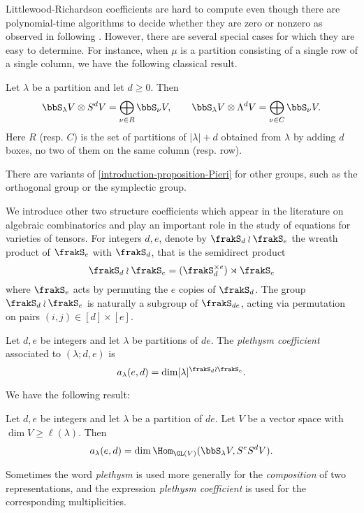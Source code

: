 Littlewood-Richardson coefficients are hard to compute \cite{Nar06} even though there are polynomial-time algorithms to decide whether they are zero or nonzero as observed in \cite{MNS12} following \cite{KT99}. However, there are several special cases for which they are easy to determine. For instance, when $\mu$ is a partition consisting of a single row of a single column, we have the following classical result.
\begin{proposition}
\label{introduction-proposition-Pieri}
 Let $\lambda$ be a partition and let $d \geq 0$. Then 
 \[
 \bbS_{\lambda} V \otimes S^d V = \bigoplus_{\nu \in R} \bbS_{\nu} V, \qquad  \bbS_{\lambda} V \otimes \Lambda^d V = \bigoplus_{\nu \in C} \bbS_{\nu} V.
 \]
Here $R$ (resp. $C$) is the set of partitions of $|\lambda|+d$ obtained from $\lambda$ by adding $d$ boxes, no two of them on the same column (resp. row).
\end{proposition}
There are variants of \ref{introduction-proposition-Pieri} for other groups, such as the orthogonal group or the symplectic group.

We introduce other two structure coefficients which appear in the literature on algebraic combinatorics and play an important role in the study of equations for varieties of tensors. For integers $d,e$, denote by $\frakS_d \wr \frakS_e$ the wreath product of $\frakS_e$ with $\frakS_d$, that is the semidirect product
\[
\frakS_d \wr \frakS_e = (\frakS_d ^{\times e}) \rtimes \frakS_e
\]
where $\frakS_e$ acts by permuting the $e$ copies of $\frakS_d$. The group $\frakS_d \wr \frakS_e $ is naturally a subgroup of $\frakS_{de}$, acting via permutation on pairs $(i,j) \in [d] \times [e]$.
\begin{definition}
 \label{introduction-definition-plethysm}
 Let $d,e$ be integers and let $\lambda$ be partitions of $de$. The {\it plethysm coefficient} associated to $(\lambda;d,e)$ is
 \[
a_\lambda(e,d) = \dim [\lambda]^{\frakS_d \wr \frakS_e}.
\]
\end{definition}
We have the following result:
\begin{lemma}
 \label{introduction-lemma-plethysmGL}
 Let $d,e$ be integers and let $\lambda$ be a partition of $de$. Let $V$ be a vector space with $\dim V \geq \ell(\lambda)$. Then
 \[
 a_\lambda(e,d) = \dim \Hom_{\GL(V)} ( \bbS_\lambda V , S^e S^d V).
 \]
\end{lemma}
Sometimes the word \emph{plethysm} is used more generally for the \emph{composition} of two representations, and the expression \emph{plethysm coefficient} is used for the corresponding multiplicities.


